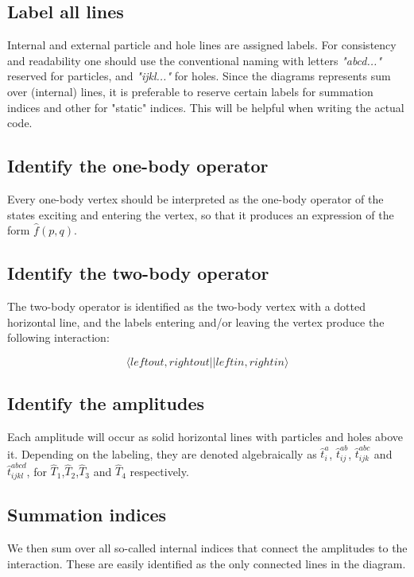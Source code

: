 \subsection{Label all lines}

Internal and external particle and hole lines are assigned labels. For
consistency and readability one should use the conventional naming
with letters \emph{"abcd..."} reserved for particles, and
\emph{"ijkl..."} for holes. Since the diagrams represents sum over
(internal) lines, it is preferable to reserve certain labels for
summation indices and other for "static" indices. This will be helpful
when writing the actual code.

\subsection{Identify the one-body operator}
Every one-body vertex should be interpreted as the one-body operator of the states exciting and entering the vertex, so that it produces an expression of the form $\hat{f}(p,q)$.

\subsection{Identify the two-body operator}
The two-body operator is identified as the two-body vertex with a dotted horizontal line, and the labels entering and/or leaving the vertex produce the following interaction:

\begin{equation}
\langle left out, right out \vert \vert left in, right in \rangle
\end{equation}

\subsection{Identify the amplitudes}
Each amplitude will occur as solid horizontal lines with particles and holes above it. Depending on the labeling, they are denoted algebraically as $\hat{t}^a_i$, $\hat{t}^{ab}_{ij}$, $\hat{t}^{abc}_{ijk}$ and $\hat{t}^{abcd}_{ijkl}$, for $\hat{T}_1$,$\hat{T}_2$,$\hat{T}_3$ and $\hat{T}_4$ respectively.

\subsection{Summation indices}
We then sum over all so-called internal indices that connect the
amplitudes to the interaction. These are easily identified as the only
connected lines in the diagram.


